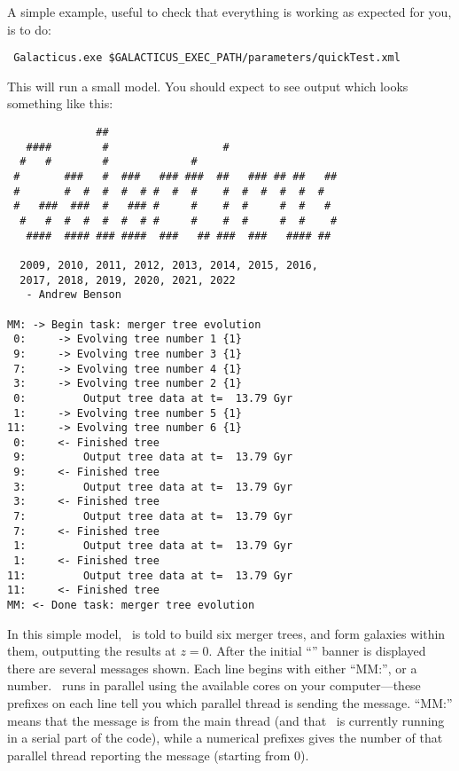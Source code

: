 A simple example, useful to check that everything is working as expected for you, is to do:
\begin{verbatim}
 Galacticus.exe $GALACTICUS_EXEC_PATH/parameters/quickTest.xml
\end{verbatim}
This will run a small model. You should expect to see output which looks something like this:
\begin{verbatim}
              ##                                     
   ####        #                  #                  
  #   #        #             #                       
 #       ###   #  ###   ### ###  ##   ### ## ##   ## 
 #       #  #  #  #  # #  #  #    #  #  #  #  #  #   
 #   ###  ###  #   ### #     #    #  #     #  #   #  
  #   #  #  #  #  #  # #     #    #  #     #  #    # 
   ####  #### ### ####  ###   ## ###  ###   #### ##  

  2009, 2010, 2011, 2012, 2013, 2014, 2015, 2016,
  2017, 2018, 2019, 2020, 2021, 2022
   - Andrew Benson

MM: -> Begin task: merger tree evolution
 0:     -> Evolving tree number 1 {1}
 9:     -> Evolving tree number 3 {1}
 7:     -> Evolving tree number 4 {1}
 3:     -> Evolving tree number 2 {1}
 0:         Output tree data at t=  13.79 Gyr
 1:     -> Evolving tree number 5 {1}
11:     -> Evolving tree number 6 {1}
 0:     <- Finished tree
 9:         Output tree data at t=  13.79 Gyr
 9:     <- Finished tree
 3:         Output tree data at t=  13.79 Gyr
 3:     <- Finished tree
 7:         Output tree data at t=  13.79 Gyr
 7:     <- Finished tree
 1:         Output tree data at t=  13.79 Gyr
 1:     <- Finished tree
11:         Output tree data at t=  13.79 Gyr
11:     <- Finished tree
MM: <- Done task: merger tree evolution
\end{verbatim}
In this simple model, \glc\ is told to build six merger trees, and form galaxies within them, outputting the results at $z=0$. After the initial ``\glc'' banner is displayed there are several messages shown. Each line begins with either ``{\normalfont \ttfamily MM:}'', or a number. \glc\ runs in parallel using the available cores on your computer---these prefixes on each line tell you which parallel thread is sending the message. ``{\normalfont \ttfamily MM:}'' means that the message is from the main thread (and that \glc\ is currently running in a serial part of the code), while a numerical prefixes gives the number of that parallel thread reporting the message (starting from 0).

